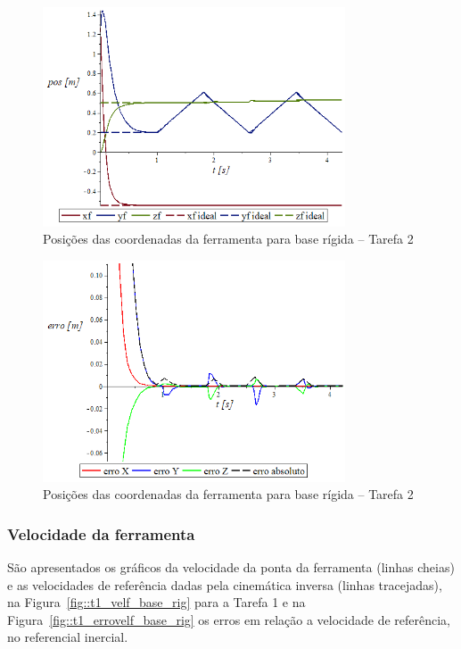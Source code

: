 \begin{figure}[h!]
	\centering 
 	\includegraphics[width=0.80\textwidth]{figs/t2_posf_base_rig}
 	\caption{Posições das coordenadas da ferramenta para base rígida -- Tarefa 2}
 	\label{fig::t2_posf_base_rig}
\end{figure}

\begin{figure}[h!]
	\centering 
 	\includegraphics[width=0.80\textwidth]{figs/t2_erroposf_base_rig}
 	\caption{Posições das coordenadas da ferramenta para base rígida -- Tarefa 2}
 	\label{fig::t2_erroposf_base_rig}
\end{figure}


\subsubsection{Velocidade da ferramenta}

São apresentados os gráficos da velocidade da ponta da ferramenta (linhas
cheias) e as velocidades de referência dadas pela cinemática inversa (linhas
tracejadas), na Figura~\ref{fig::t1_velf_base_rig} para a Tarefa 1 e na
Figura~\ref{fig::t1_errovelf_base_rig} os erros em relação a velocidade de
referência, no referencial inercial.


